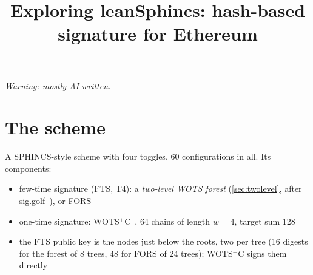 \documentclass[11pt]{article}
\title{Exploring leanSphincs: hash-based signature for Ethereum}
\author{}
\date{}
\begin{document}
\maketitle
\vspace{-3em}

\begin{center}
  \small\itshape Warning: mostly AI-written.
\end{center}

\section{The scheme}
\label{sec:scheme}

A SPHINCS-style scheme with four toggles, 60 configurations in all. Its components:
\begin{itemize}
  \item few-time signature (FTS, T4): a \emph{two-level WOTS forest} (\cref{sec:twolevel}, after
        sig.golf~\cite{siggolf}), or FORS
  \item one-time signature: WOTS$^+$C~\cite{HK22C}, 64 chains of length $w=4$, target sum 128
  \item the FTS public key is the nodes just below the roots, two per tree (16 digests for the forest of 8
        trees, 48 for FORS of 24 trees); WOTS$^+$C signs them directly
\end{itemize}
\end{document}
